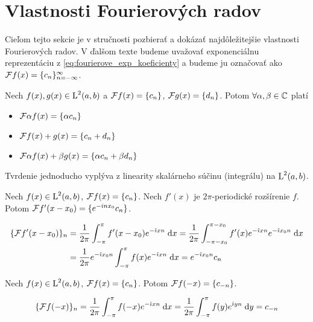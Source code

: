 \section{Vlastnosti Fourierových radov}
Cieľom tejto sekcie je v stručnosti pozbierať a dokázať
najdôležitejšie vlastnosti Fourierových radov. V ďalšom texte budeme
uvažovať exponenciálnu reprezentáciu z
\eqref{eq:fourierove_exp_koeficienty} a budeme ju označovať ako
$\mathcal{F} f(x) = \{c_n\}_{n=-\infty}^{\infty}$.

\begin{veta}[Linearita]
Nech $f(x), g(x) \in \mbox{L}^2(a,b)$ a $\mathcal{F}{f(x)} = \{c_n\}$,
$\mathcal{F}{g(x)} = \{d_n\}$.
Potom $\forall \alpha,\beta \in \mathbb{C}$ platí
\begin{itemize}
    \item $\mathcal{F}{\alpha f(x)} = \{\alpha c_n\}$
    \item $\mathcal{F}{f(x) + g(x)} = \{c_n + d_n\}$
    \item $\mathcal{F}{\alpha f(x) + \beta g(x)} = \{\alpha c_n + \beta
    d_n\}$
\end{itemize}
\end{veta}
\begin{dokaz}
 Tvrdenie jednoducho vyplýva z linearity skalárneho súčinu
 (integrálu) na $\mbox{L}^2(a,b)$.
\end{dokaz}

\begin{veta}
Nech $f(x) \in \mbox{L}^2(a,b)$, $\mathcal{F}{f(x)} = \{c_n\}$.
Nech $f'(x)$ je $2\pi$-periodické rozšírenie $f$. Potom
$\mathcal{F}{f'(x-x_0)} = \{ e^{-\hat{\imath} n x_0} c_n \}$.
\label{veta:time_shift}
\end{veta}
\begin{dokaz}
    \begin{equation*}
    \begin{split}
      \{\mathcal{F} f'(x-x_0)\}_n &= 
        \frac{1}{2\pi} \int_{-\pi}^{\pi} f'(x-x_0) e^{-\hat{\imath} x n} \; \mathrm{d} x 
        = \frac{1}{2\pi} \int_{-\pi - x_0}^{\pi - x_0} f'(x) e^{-\hat{\imath} x
            n} e^{-\hat{\imath} x_0 n} \; \mathrm{d} x \\
        &= \frac{1}{2\pi} e^{-\hat{\imath} x_0 n} \int_{-\pi}^{\pi} f(x) e^{-\hat{\imath} x n} \; \mathrm{d} x
         = e^{-\hat{\imath} x_0 n} c_n
    \end{split}
    \end{equation*}
\end{dokaz}

\begin{veta}
Nech $f(x) \in \mbox{L}^2(a,b)$, $\mathcal{F}{f(x)} = \{c_n\}$. Potom
$\mathcal{F}{f(-x)} = \{c_{-n} \}$.
\label{veta:time_reverse}
\end{veta}
\begin{dokaz}
    \begin{equation*}
      \{\mathcal{F} f(-x)\}_n
        = \frac{1}{2\pi} \int_{-\pi}^{\pi} f(-x) e^{-\hat{\imath} x n} \; \mathrm{d} x 
        = \frac{1}{2\pi} \int_{-\pi}^{\pi} f(y) e^{\hat{\imath} y n} \; \mathrm{d} y
        = c_{-n}
    \end{equation*}
\end{dokaz}


